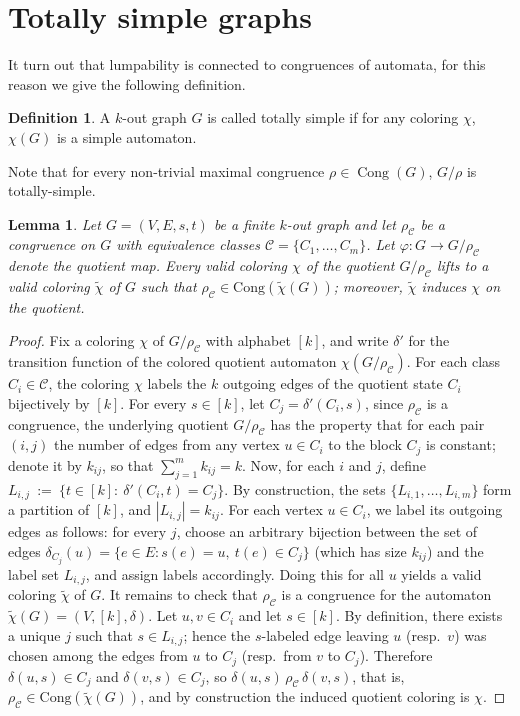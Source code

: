 \documentclass[a4paper,10pt]{amsart}
\theoremstyle{plain}
\newtheorem{lemma}[theorem]{Lemma}
\theoremstyle{definition}
\newtheorem{definition}[theorem]{Definition}
\DeclareMathOperator{\Cong}{Cong}
\begin{document}
\section{Totally simple graphs}
It turn out that lumpability is connected to congruences of automata, for this reason we give the following definition. 
\begin{definition}
A $k$-out graph $G$ is called totally simple if for any coloring $\chi$, $\chi(G)$ is a simple automaton. 
\end{definition}
Note that for every non-trivial maximal congruence $\rho\in\Cong(G)$, $G/\rho$ is totally-simple. 
\begin{lemma}\label{lem:lifting-coloring}
Let $G=(V,E,s,t)$ be a finite $k$-out graph and let $\rho_{\mathcal C}$ be a congruence on $G$ with equivalence classes $\mathcal C=\{C_1,\dots,C_m\}$. Let $\varphi:G\to G/\rho_{\mathcal{C}}$ denote the quotient map.
Every valid coloring $\chi$ of the quotient $G/\rho_{\mathcal C}$ lifts to a valid coloring $\widetilde{\chi}$ of $G$ such that $\rho_{\mathcal C}\in \mathrm{Cong}(\widetilde{\chi}(G))$; moreover, $\widetilde{\chi}$ induces $\chi$ on the quotient.
\end{lemma}
\begin{proof}
Fix a coloring $\chi$ of $G/\rho_{\mathcal C}$ with alphabet $[k]$, and write $\delta'$ for the transition function of the
colored quotient automaton $\chi(G/\rho_{\mathcal C})$. For each class $C_i\in\mathcal C$, the coloring $\chi$ labels the $k$ outgoing edges of the quotient state $C_i$ bijectively by $[k]$. For every $s\in [k]$, let $C_j=\delta'(C_i,s)$, since $\rho_{\mathcal C}$ is a congruence, the underlying quotient $G/\rho_{\mathcal C}$ has the property that for each pair $(i,j)$ the number of edges from any vertex $u\in C_i$ to the block $C_j$ is constant; denote it by $k_{ij}$, so that $\sum_{j=1}^m k_{ij}=k$. Now, for each $i$ and $j$, define $L_{i,j}\ :=\ \{t\in[k]:\ \delta'(C_i,t)=C_j\}$. By construction, the sets $\{L_{i,1},\dots,L_{i,m}\}$ form a partition of $[k]$, and $|L_{i,j}|=k_{ij}$. For each vertex $u\in C_i$, we label its outgoing edges as follows: for every $j$, choose an arbitrary bijection between the set of edges
$\delta_{C_j}(u)=\{e\in E: s(e)=u,\ t(e)\in C_j\}$ (which has size $k_{ij}$) and the label set $L_{i,j}$, and assign labels accordingly.
Doing this for all $u$ yields a valid coloring $\widetilde{\chi}$ of $G$. It remains to check that $\rho_{\mathcal C}$ is a congruence for the automaton $\widetilde{\chi}(G)=(V, [k], \delta)$. Let $u,v\in C_i$ and let $s\in [k]$. By definition, there exists a unique $j$ such that $s\in L_{i,j}$; hence the
$s$-labeled edge leaving $u$ (resp.\ $v$) was chosen among the edges from $u$ to $C_j$ (resp.\ from $v$ to $C_j$). Therefore $\delta(u,s)\in C_j$ and $\delta(v,s)\in C_j$, so $\delta(u,s)\,\rho_{\mathcal C}\,\delta(v,s)$, that is, $\rho_{\mathcal C}\in \mathrm{Cong}(\widetilde{\chi}(G))$, and by construction the induced quotient coloring is $\chi$.
\end{proof}
\end{document}
